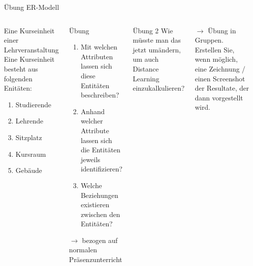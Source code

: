 \begin{frame}{Übung ER-Modell}
  \begin{columns}%
    \footnotesize
    \begin{block}{Eine Kurseinheit einer Lehrveranstaltung}
    Eine Kurseinheit besteht aus folgenden Enitäten:
    \begin{enumerate}
        \item Studierende
        \item Lehrende
        \item Sitzplatz
        \item Kursraum
        \item Gebäude
    \end{enumerate}
    \end{block}


      \footnotesize
      \begin{exampleblock}{Übung}
      \begin{enumerate}
          \item Mit welchen Attributen lassen sich diese Entitäten beschreiben?
          \item Anhand welcher Attribute lassen sich die Entitäten jeweils identifizieren?
          \item Welche Beziehungen existieren zwischen den Entitäten?
      \end{enumerate}
      $\to$ bezogen auf normalen Präsenzunterricht
      \end{exampleblock}
      \begin{exampleblock}{Übung 2}
      Wie müsste man das jetzt umändern, um auch Distance Learning einzukalkulieren?
      \end{exampleblock}
      \footnotesize
      $\to$ Übung in Gruppen. Erstellen Sie, wenn möglich, eine Zeichnung / einen Screenshot der Resultate, der dann vorgestellt wird.
  \end{columns}

\end{frame}


